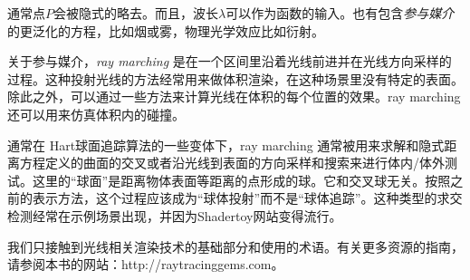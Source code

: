 \documentclass[12pt]{article}
\begin{document}
通常点$P$会被隐式的略去。而且，波长$\lambda$可以作为函数的输入。也有包含\textit{参与媒介}的更泛化的方程，比如烟或雾，物理光学效应比如衍射。

关于参与媒介，\textit{ray marching} 是在一个区间里沿着光线前进并在光线方向采样的过程。这种投射光线的方法经常用来做体积渲染，在这种场景里没有特定的表面。除此之外，可以通过一些方法来计算光线在体积的每个位置的效果。ray marching还可以用来仿真体积内的碰撞。

通常在 Hart球面追踪算法\cite{Hart1996}的一些变体下，ray marching 通常被用来求解和隐式距离方程定义的曲面的交叉或者沿光线到表面的方向采样和搜索来进行体内/体外测试。这里的“球面”是距离物体表面等距离的点形成的球。它和交叉球无关。按照之前的表示方法，这个过程应该成为“球体投射”而不是“球体追踪”。这种类型的求交检测经常在示例场景出现，并因为Shadertoy网站变得流行。

我们只接触到光线相关渲染技术的基础部分和使用的术语。有关更多资源的指南，请参阅本书的网站：http://raytracinggems.com。
 


\end{document}
